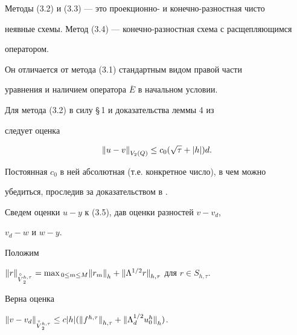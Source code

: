 Методы (3.2) и (3.3) --- это проекционно- и конечно-разностная чисто 


неявные схемы. Метод (3.4) --- конечно-разностная схема с расщепляющимся 


оператором.


Он отличается от метода (3.1) стандартным видом правой части


уравнения и наличием оператора ${\overline E}$ в начальном условии.





Для метода (3.2) в силу \S\,1 и доказательства леммы 4 из \cite{Z3}


следует оценка


\begin{equation}


{\ver u-v\ver}_{V_2(Q)}\le c_0(\po)d.


\end{equation}


Постоянная $c_0$ в ней абсолютная (т.е. конкретное число), в чем можно 


убедиться, проследив за доказательством в \cite{Z3}.





Сведем оценки $u-y$ к (3.5), дав оценки разностей $v-v_d$,


$v_d-w$ и $w-y$.


Положим 


${\|r\|}_{\overset{\circ}{V}{}_2^{h,\tau}}={\ma r_m\ver}_h


+{\ver\Lambda^{1/2}r\ver}_{h,\tau}$ для $r\in S_{h,\tau}$.





\begin{lem} Верна оценка


${\ver v-v_d \ver}_{\overset{\circ}{V}{}_2^{h,\tau}}\le c\vert h\vert


({\ver f^{h,\tau}\ver}_{h,\tau}+{\ver\Lambda_d^{1/2}u_0^h\ver}_{h})$.


\end{lem}





